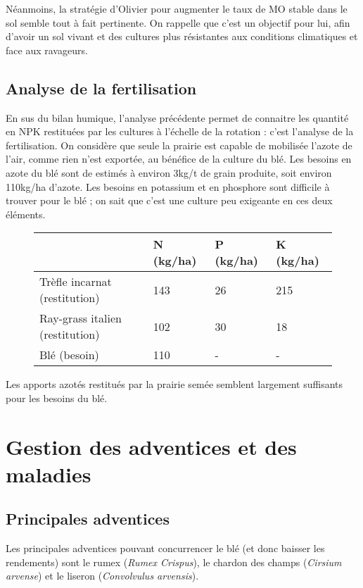 \documentclass{article}
\begin{document}
Néanmoins, la stratégie d'Olivier pour augmenter le taux de MO stable dans le sol semble tout à fait pertinente. On rappelle que c'est un objectif pour lui, afin d'avoir un sol vivant et des cultures plus résistantes aux conditions climatiques et face aux ravageurs. 

\subsection{Analyse de la fertilisation}

En sus du bilan humique, l'analyse précédente permet de connaitre les quantité en NPK restituées par les cultures à l'échelle de la rotation : c'est l'analyse de la fertilisation. On considère que seule la prairie est capable de mobilisée l'azote de l'air, comme rien n'est exportée, au bénéfice de la culture du blé. Les besoins en azote du blé sont de estimés à environ 3kg/t de grain produite, soit environ 110kg/ha d'azote. Les besoins en potassium et en phosphore sont difficile à trouver pour le blé ; on sait que c'est une culture peu exigeante en ces deux éléments.

\begin{figure}[h!]
\begin{tabular}{|p{5cm}|p{2cm}|p{2cm}|p{2cm}|}
\hline
 & N (kg/ha) & P (kg/ha) & K (kg/ha)\\
\hline
Trèfle incarnat (restitution) &  143 & 26 & 215  \\
\hline
Ray-grass italien (restitution) & 102 & 30 & 18 \\
\hline
Blé (besoin) & 110 & - & -\\
\hline
\end{tabular}
\end{figure}

Les apports azotés restitués par la prairie semée semblent largement suffisants pour les besoins du blé.

\section{Gestion des adventices et des maladies}

\subsection{Principales adventices}

Les principales adventices pouvant concurrencer le blé (et donc baisser les rendements) sont le rumex (\textit{Rumex Crispus}), le chardon des champs (\textit{Cirsium arvense}) et le liseron (\textit{Convolvulus arvensis}).
\end{document}
